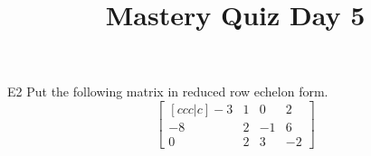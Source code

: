 \documentclass{sbgLAquiz}
\title{Mastery Quiz Day 5 }
\begin{document}
\begin{problem}{E2}
Put the following matrix in reduced row echelon form.
$$\begin{bmatrix}[ccc|c] -3 & 1 & 0 & 2 \\ -8 & 2 & -1 & 6 \\ 0 & 2 & 3 & -2 \end{bmatrix}$$
\end{problem}
\end{document}
